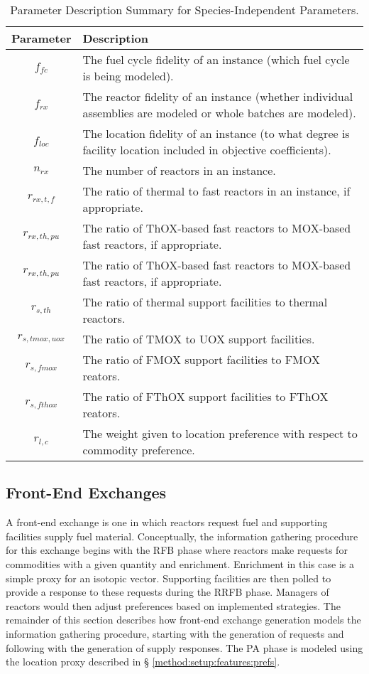 \begin{table}[h]
\centering
\caption{Parameter Description Summary for Species-Independent Parameters.}
\label{tbl:global_params}
\begin{tabularx}{\columnwidth-10pt}{|c|X|} %
\hline
Parameter    & 
Description
\\ \hline
$f_{fc}$     & 
The fuel cycle fidelity of an instance (which fuel cycle is being modeled).
\\ \hline
$f_{rx}$   & 
The reactor fidelity of an instance (whether individual assemblies are modeled
or whole batches are modeled).  
\\ \hline
$f_{loc}$    & 
The location fidelity of an instance (to what degree is facility location
included in objective coefficients).
\\ \hline
$n_{rx}$   & 
The number of reactors in an instance.
\\ \hline
$r_{rx, t, f}$   & 
The ratio of thermal to fast reactors in an instance, if appropriate.
\\ \hline
$r_{rx, th, pu}$ & 
The ratio of ThOX-based fast reactors to MOX-based fast reactors, if appropriate.
\\ \hline
$r_{rx, th, pu}$ & 
The ratio of ThOX-based fast reactors to MOX-based fast reactors, if appropriate.
\\ \hline
$r_{s, th}$ & 
The ratio of thermal support facilities to thermal reactors.  
\\ \hline
$r_{s, tmox, uox}$ & 
The ratio of TMOX to UOX support facilities.
\\ \hline
$r_{s, fmox}$ & 
The ratio of FMOX support facilities to FMOX reators.
\\ \hline
$r_{s, fthox}$ & 
The ratio of FThOX support facilities to FThOX reators.
\\ \hline
$r_{l, c}$ & 
The weight given to location preference with respect to commodity preference.
\\ \hline
\end{tabularx}
\end{table}

\subsection{Front-End Exchanges}\label{method:setup:front}

A front-end exchange is one in which reactors request fuel and supporting
facilities supply fuel material. Conceptually, the information gathering
procedure for this exchange begins with the RFB phase where reactors make
requests for commodities with a given quantity and enrichment. Enrichment in
this case is a simple proxy for an isotopic vector. Supporting facilities are
then polled to provide a response to these requests during the RRFB
phase. Managers of reactors would then adjust preferences based on implemented
strategies. The remainder of this section describes how front-end exchange
generation models the information gathering procedure, starting with the
generation of requests and following with the generation of supply
responses. The PA phase is modeled using the location proxy described in \S
\ref{method:setup:features:prefs}.

